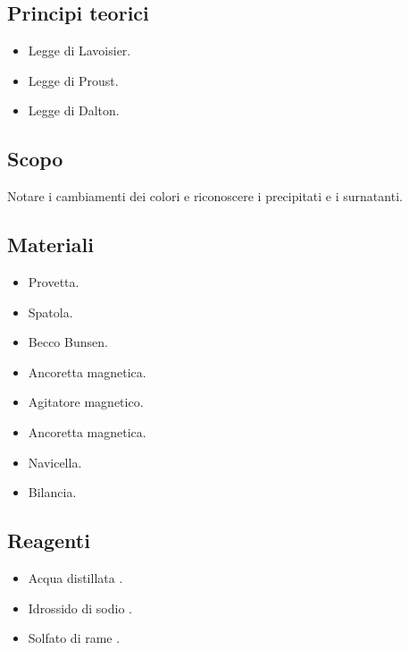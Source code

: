 \documentclass[a4paper,10pt]{article}
\begin{document}
	\subsection{Principi teorici}
	\begin{itemize}
		\item Legge di Lavoisier.
		\item Legge di Proust.
		\item Legge di Dalton.
	\end{itemize}
	\subsection{Scopo}
	Notare i cambiamenti dei colori e riconoscere i precipitati e i surnatanti.
	\subsection{Materiali}
	\begin{itemize}
		\item Provetta.
		\item Spatola.
		\item Becco Bunsen.
		\item Ancoretta magnetica.
		\item Agitatore magnetico.
		\item Ancoretta magnetica.
		\item Navicella.
		\item Bilancia.
	\end{itemize}
	\subsection{Reagenti}
	\begin{itemize}
		\item Acqua distillata .
		\item Idrossido di sodio .
		\item Solfato di rame .
	\end{itemize}
\end{document}
